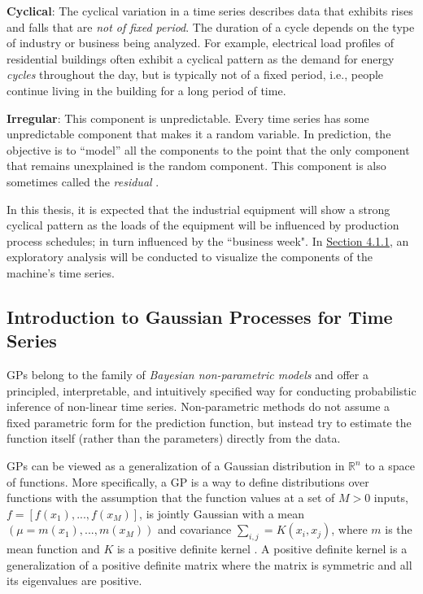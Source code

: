 \textbf{Cyclical}: The cyclical variation in a time series describes data that exhibits rises and falls that are \textit{not of fixed period}. The duration of a cycle depends on the type of industry or business being analyzed. For example, electrical load profiles of residential buildings often exhibit a cyclical pattern as the demand for energy \textit{cycles} throughout the day, but is typically not of a fixed period, i.e., people continue living in the building for a long period of time. 

\textbf{Irregular}: This component is unpredictable. Every time series has some unpredictable component that makes it a random variable. In prediction, the objective is to “model” all the components to the point that the only component that remains unexplained is the random component. This component is also sometimes called the \textit{residual} \cite{tsa}. 

In this thesis, it is expected that the industrial equipment will show a strong cyclical pattern as the loads of the equipment will be influenced by production process schedules; in turn influenced by the ``business week". In \hyperlink{subsubsection.4.1.1}{Section 4.1.1}, an exploratory analysis will be conducted to visualize the components of the machine's time series. 


\subsection{Introduction to Gaussian Processes for Time Series}

\ac{GPs} belong to the family of \textit{Bayesian non-parametric models} and offer a principled, interpretable, and intuitively specified way for conducting probabilistic inference of non-linear time series. Non-parametric methods do not assume a fixed parametric form for the prediction function, but instead try to estimate the function itself (rather than the parameters) directly from the data. 

GPs can be viewed as a generalization of a Gaussian distribution in $\mathbb{R}^n$ to a space of functions. More specifically, a GP is a way to define distributions over functions with the assumption that the function values at a set of $M > 0$ inputs, $f = [f(x_1), . . .,f(x_M)]$, is jointly Gaussian with a mean $(\mu = m(x_1), . . .,m(x_M))$ and covariance $\sum_{i, j} = K(x_i, x_j)$, where $m$ is the mean function and $K$ is a positive definite kernel \cite{pml1Book}. A positive definite kernel is a generalization of a positive definite matrix where the matrix is symmetric and all its eigenvalues are positive. 

